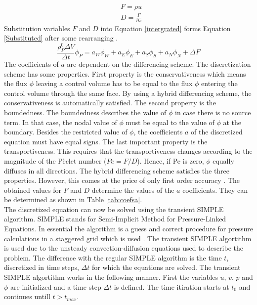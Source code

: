 \documentclass{CFD2017}
\begin{document}
\begin{align}
&F = \rho u\\
&D=\frac{\Gamma}{\partial x}
\end{align}
Substitution variables $F$ and $D$ into Equation \ref{intergrated} forms Equation \ref{Substituted} after some rearranging \cite{Versteeg2007}.
\begin{equation}
\label{Substituted}
\frac{\rho_P^0 \Delta V}{\Delta t}\phi_P=a_W\phi_W+a_E\phi_E+a_S\phi_S+a_N\phi_N +\Delta F
\end{equation}
The coefficients of $a$ are dependent on the differencing scheme. The discretization scheme has some properties. First property is the conservativeness which means the flux $\phi$ leaving a control volume has to be equal to the flux $\phi$ entering the control volume through the same face. By using a hybrid differencing scheme, the conservativeness is automatically satisfied. The second property is the boundedness. The boundedness describes the value of $\phi$ in case there is no source term. In that case, the nodal value of $\phi$ must be equal to the value of $\phi$ at the boundary. Besides the restricted value of $\phi$, the coefficients $a$ of the discretized equation must have equal signs. The last important property is the transportiveness. This requires that the transportiveness changes according to the magnitude of the P\`{e}clet number ($Pe=F/D$). Hence, if Pe is zero, $\phi$ equally diffuses in all directions. The hybrid differencing scheme satisfies the three properties. However, this comes at the price of only first order accuracy \cite{Versteeg2007}. The obtained values for $F$ and $D$ determine the values of the $a$ coefficients. They can be determined as shown in Table \ref{tab:coefsa}.
\\
The discretized equation can now be solved using the transient SIMPLE algorithm. SIMPLE stands for Semi-Implicit Method for Pressure-Linked Equations. In essential the algorithm is a guess and correct procedure for pressure calculations in a staggered grid which is used \cite{Versteeg2007}. The transient SIMPLE algortithm is used due to the unsteady convection-diffusion equations used to describe the problem. The difference with the regular SIMPLE algorithm is the time $t$, discretized in time steps, $\Delta t$ for which the equations are solved. The transient SIMPLE algortithm works in the following manner. First the variables $u$, $v$, $p$ and $\phi$ are initialized and a time step $\Delta t$ is defined. The time itiration starts at $t_0$ and continues untill $t>t_{max}$.
\end{document}
